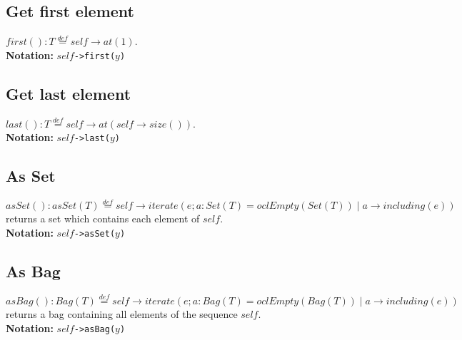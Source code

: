 \subsection{Get first element}
$\mathit{first}():T\stackrel{def}{=}\mathit{self}\rightarrow\mathit{at}(1)$.\\
  {\bf Notation:} $\mathit{self}$\verb+->first(+$y$\verb+)+
\subsection{Get last element}
$\mathit{last}():T\stackrel{def}{=}\mathit{self}\rightarrow\mathit{at}(\mathit{self}\rightarrow\mathit{size}())$.\\
  {\bf Notation:} $\mathit{self}$\verb+->last(+$y$\verb+)+
\subsection{As Set}
$\mathit{asSet}():
  \mathit{asSet}(T)\stackrel{def}{=}\mathit{self}\rightarrow\mathit{iterate}(e;a:\mathit{Set}(T)=\mathit{oclEmpty}(\mathit{Set}(T))\mid
  a\rightarrow\mathit{including}(e))$ returns a set which contains each
  element of $\mathit{self}$.\\
  {\bf Notation:} $\mathit{self}$\verb+->asSet(+$y$\verb+)+
\subsection{As Bag}
$\mathit{asBag}():
  \mathit{Bag}(T)\stackrel{def}{=}\mathit{self}\rightarrow\mathit{iterate}(e;a:\mathit{Bag}(T)=\mathit{oclEmpty}(\mathit{Bag}(T))\mid
  a\rightarrow\mathit{including}(e))$ returns a bag containing all elements
  of the sequence $\mathit{self}$.\\
  {\bf Notation:} $\mathit{self}$\verb+->asBag(+$y$\verb+)+
